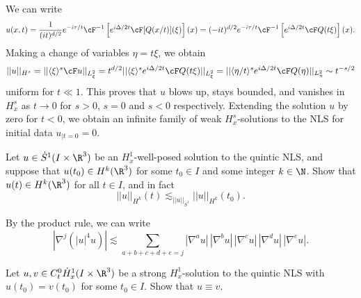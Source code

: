 \begin{solution}
	We can write
		\[ u(x, t) = \frac{1}{(it)^{d/2}} e^{-i \tau/t} \cF^{-1} \left[e^{i \Delta/2t} \cF [Q(x/t)](\xi)\right] (x)= (-i t)^{d/2} e^{-i \tau/t} \cF^{-1} \left[ e^{i \Delta/2t} \cF Q(t \xi)\right] (x). \]
	Making a change of variables $\eta = t \xi$, we obtain
		\[ ||u||_{H^s} = || \langle \xi \rangle^s \cF u||_{L^2_\xi} = t^{d/2} || \langle \xi \rangle^s e^{i \Delta/2t} \cF Q(t\xi) ||_{L^2_\xi} = ||\langle \eta/t\rangle^{s} e^{i \Delta/2t} \cF Q(\eta)||_{L^2_\eta} \sim t^{-s/2} \]
	uniform for $t \ll 1$. This proves that $u$ blows up, stays bounded, and vanishes in $H^s_x$ as $t \to 0$ for $s > 0$, $s = 0$ and $s < 0$ respectively. Extending the solution $u$ by zero for $t < 0$, we obtain an infinite family of weak $H^s_x$-solutions to the NLS for initial data $u_{|t = 0} = 0$. 
\end{solution}

\begin{statement}
	Let $u \in \dot S^1 (I \times \R^3)$ be an $H^1_x$-well-posed solution to the quintic NLS, and suppose that $u(t_0) \in H^k (\R^3)$ for some $t_0 \in I$ and some integer $k \in \N$. Show that $u(t) \in H^k (\R^3)$ for all $t \in I$, and in fact
		\[ ||u||_{H^k} (t) \lesssim_{||u||_{\dot S^1}} ||u||_{H^k} (t_0).  \]
\end{statement}

\begin{solution}
	By the product rule, we can write
		\[ |\nabla^j (|u|^4 u) | \lesssim \sum_{a + b + c + d + e = j} |\nabla^a u| \, |\nabla^b u| \, |\nabla^c u| \, |\nabla^d u| \, |\nabla^e u|. \]
\end{solution}
\begin{statement}
	Let $u, v \in C^0_t \dot H^1_x (I \times \R^3)$ be a strong $H^1_x$-solution to the quintic NLS with $u(t_0) = v(t_0)$ for some $t_0 \in I$. Show that $u \equiv v$. 
\end{statement}

